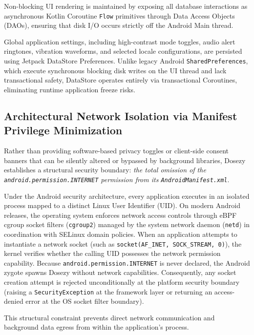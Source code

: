 \documentclass[11pt,a4paper]{article}
\begin{document}
Non-blocking UI rendering is maintained by exposing all database interactions as asynchronous Kotlin Coroutine \texttt{Flow} primitives through Data Access Objects (DAOs), ensuring that disk I/O occurs strictly off the Android Main thread.

Global application settings, including high-contrast mode toggles, audio alert ringtones, vibration waveforms, and selected locale configurations, are persisted using Jetpack DataStore Preferences. Unlike legacy Android \texttt{SharedPreferences}, which execute synchronous blocking disk writes on the UI thread and lack transactional safety, DataStore operates entirely via transactional Coroutines, eliminating runtime application freeze risks.

\subsection{Architectural Network Isolation via Manifest Privilege Minimization}

Rather than providing software-based privacy toggles or client-side consent banners that can be silently altered or bypassed by background libraries, Dosezy establishes a structural security boundary: \emph{the total omission of the \texttt{android.permission.INTERNET} permission from its \texttt{AndroidManifest.xml}}.

Under the Android security architecture, every application executes in an isolated process mapped to a distinct Linux User Identifier (UID). On modern Android releases, the operating system enforces network access controls through eBPF cgroup socket filters (\texttt{cgroup2}) managed by the system network daemon (\texttt{netd}) in coordination with SELinux domain policies. When an application attempts to instantiate a network socket (such as \texttt{socket(AF\_INET, SOCK\_STREAM, 0)}), the kernel verifies whether the calling UID possesses the network permission capability. Because \texttt{android.permission.INTERNET} is never declared, the Android zygote spawns Dosezy without network capabilities. Consequently, any socket creation attempt is rejected unconditionally at the platform security boundary (raising a \texttt{SecurityException} at the framework layer or returning an access-denied error at the OS socket filter boundary).

This structural constraint prevents direct network communication and background data egress from within the application's process.
\end{document}
